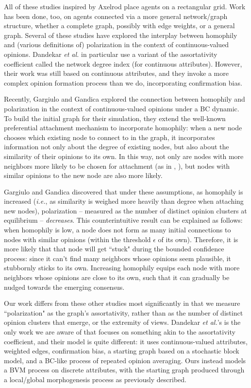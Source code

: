 All of these studies inspired by Axelrod place agents on a rectangular grid.
Work has been done, too, on agents connected via a more general network/graph
structure, whether a complete graph, possibly with edge
weights\cite{deffuant_how_2002,degroot_reaching_1974}, or a general
graph\cite{dandekar_biased_2013}. Several of these studies have explored the
interplay between homophily and (various definitions of) polarization in the
context of continuous-valued opinions. Dandekar \textit{et
al.}\cite{dandekar_biased_2013} in particular use a variant of the
assortativity coefficient called the network degree index (for continuous
attributes). However, their work was still based on continuous attributes, and
they invoke a more complex opinion formation process than we do, incorporating
confirmation bias.

Recently, Gargiulo and Gandica\cite{gargiulo_role_2017} explored the
connection between homophily and polarization in the context of
continuous-valued opinions under a BC dynamic. To build the initial graph for
their simulation, they extend the well-known preferential attachment mechanism
\cite{barabasi_emergence_1999} to incorporate homophily: when a new node
chooses which existing node to connect to in the graph, it incorporates
information not only about the degree of existing nodes, but also about
the similarity of their opinions to its own. In this way, not only are
nodes with more neighbors more likely to be chosen for attachment (as in
\cite{barabasi_emergence_1999}, \cite{deffuant_mixing_2000}), but nodes with
similar opinions to the new node are also more likely. 

Gargiulo and Gandica discovered that under these assumptions, as homophily is
increased (\textit{i.e.}, as similarity is weighed more heavily than degree
when attaching new nodes), polarization -- measured as the number of distinct
opinion clusters at equilibrium -- \textit{decreases}. This counterintuitive
result can be explained as follows: when homophily is low, a node does not
form as many initial connections to nodes with similar opinions (within the
threshold $\epsilon$ of its own). Therefore, it is more likely that that node
will get ``stuck" during the bounded confidence process: since it can't find
many neighbors whose opinions seem plausible, it stubbornly sticks to its own.
Increasing homophily equips each node with more neighbors whose opinions are
close to its own, such that it can gradually be nudged towards the emerging
consensus.

Our work differs from these other studies most significantly in that we
measure ``polarization" as the graph's assortativity, rather than as the
number of distinct opinion clusters that emerge, or the extremity of views.
Dandekar \textit{et al.}'s is the only work we are aware of that focuses on
something akin to the assortativity coefficient, and their model is quite
different: it uses continuous-valued attributes, weighted edges, confirmation
bias, a starting graph based on a stochastic block model, and a BC-like
process of repeated opinion averaging. Ours instead models a BVM process on
discrete attributes, with the starting graph produced through a local/global
morphogenesis process as previously described.

